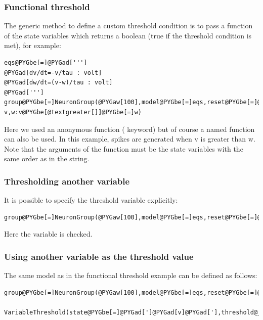 \documentclass[letterpaper,10pt,english]{manual}
\begin{document}
\subsubsection{Functional threshold}

The generic method to define a custom threshold condition is to pass a function of the
state variables which returns a boolean (true if the threshold condition is met), for example:

\begin{Verbatim}[commandchars=@\[\]]
eqs@PYGbe[=]@PYGad[''']
@PYGad[dv/dt=-v/tau : volt]
@PYGad[dw/dt=(v-w)/tau : volt]
@PYGad[''']
group@PYGbe[=]NeuronGroup(@PYGaw[100],model@PYGbe[=]eqs,reset@PYGbe[=]@PYGaw[0]@PYGbe[*]mV,threshold@PYGbe[=]@PYGay[lambda] v,w:v@PYGbe[@textgreater[]]@PYGbe[=]w)
\end{Verbatim}

Here we used an anonymous function ( keyword) but of course a named function can also
be used. In this example, spikes are generated when v is greater than w.
Note that the arguments of the function must be the state variables with the same order as
in the \hyperlink{brian.Equations}{} string.


\subsubsection{Thresholding another variable}

It is possible to specify the threshold variable explicitly:

\begin{Verbatim}[commandchars=@\[\]]
group@PYGbe[=]NeuronGroup(@PYGaw[100],model@PYGbe[=]eqs,reset@PYGbe[=]@PYGaw[0]@PYGbe[*]mV,threshold@PYGbe[=]Threshold(@PYGaw[0]@PYGbe[*]mV,state@PYGbe[=]@PYGad[']@PYGad[w]@PYGad[']))
\end{Verbatim}

Here the variable  is checked.


\subsubsection{Using another variable as the threshold value}

The same model as in the functional threshold example can be defined as follows:

\begin{Verbatim}[commandchars=@\[\]]
group@PYGbe[=]NeuronGroup(@PYGaw[100],model@PYGbe[=]eqs,reset@PYGbe[=]@PYGaw[0]@PYGbe[*]mV,threshold@PYGbe[=]\
      VariableThreshold(state@PYGbe[=]@PYGad[']@PYGad[v]@PYGad['],threshold@_state@PYGbe[=]@PYGad[']@PYGad[w]@PYGad[']))
\end{Verbatim}
\end{document}
